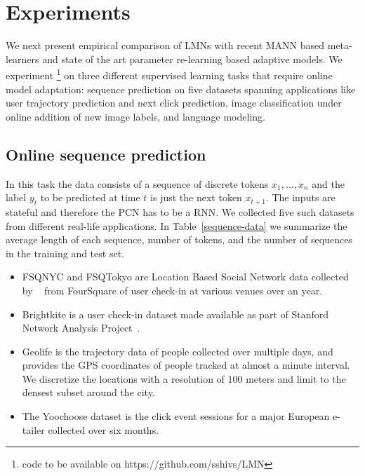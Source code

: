 \documentclass[letterpaper]{article} %
\begin{document}
\section{Experiments}
We next present empirical comparison of LMNs with recent MANN based meta-learners and state of the art parameter re-learning based adaptive models. We experiment \footnote{code to be available on https://github.com/sshivs/LMN} on three different supervised learning tasks that require online model adaptation: sequence prediction on five datasets spanning applications like user trajectory prediction and next click prediction,  image classification under online addition of new image labels, and language modeling.


\subsection{Online sequence prediction}
\label{sec-expt-online}
In this task the data consists of a sequence of discrete tokens $x_1,\ldots,x_n$ and the label $y_t$ to be predicted at time $t$  is just the next token $x_{t+1}$.  The inputs are stateful and therefore the PCN has to be a RNN.
We collected five such datasets from different real-life applications. In Table~\ref{sequence-data} we summarize the average length of each sequence, number of tokens, and the number of sequences in the training and test set.
\begin{itemize}
\item
FSQNYC and FSQTokyo are Location Based Social Network data collected by ~\cite{yang2014} from FourSquare of user check-in at various venues over an year.

\item Brightkite \cite{ChoMyLes11} is a user check-in dataset made available as part of Stanford Network Analysis Project~\cite{snapnets}.

\item
Geolife \cite{geolife09} is the trajectory data of people collected over multiple days, and provides the GPS coordinates of people tracked at almost a minute interval. We discretize the locations with a resolution of 100 meters and limit to the densest subset around the city.
\item
The Yoochoose dataset \cite{Ben-Shimon:2015:RCY:2792838.2798723} is the click event sessions for a major European e-tailer collected over six months.

\end{itemize}
\end{document}
